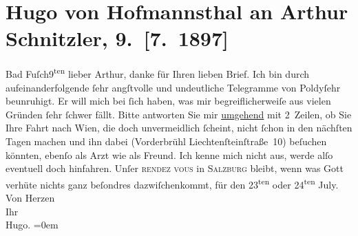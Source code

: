 

         
         \renewcommand{\erwaehntePersonen}{Personen: Leopold von Andrian-Werburg, Hugo von Hofmannsthal}
         \renewcommand{\erwaehnteOrte}{Orte: Bad Fusch, Bad Ischl, Liechtensteinstraße, Salzburg, Wien}
         \renewcommand{\erwaehnteWerke}{}
               \section[Hugo von Hofmannsthal an Arthur Schnitzler, 9. {[}7. 1897{]}]{ Hugo von Hofmannsthal an Arthur Schnitzler, 9. {[}7. 1897{]}}\nopagebreak{}\rehead{ }\begin{ledgroupsized}[t]{13cm}\normalsize\beginnumbering \toendnotes[C]{\smallbreak\pagebreak[2]} 
\pstart
           \raggedleft{}{\pb}Bad Fuſch9\textsuperscript{ten}\pend
           \pstart
           lieber Arthur, danke für Ihren lieben Brief. Ich bin durch
               aufeinanderfolgende ſehr angſtvolle und undeutliche Telegramme von Poldyſehr beunruhigt. Er will mich bei ſich haben, was
               mir begreiflicherweiſe aus vielen Gründen ſehr ſchwer fällt. Bitte antworten Sie mir
                  \uline{umgehend} mit 2 Zeilen, ob Sie Ihre Fahrt nach Wien, die doch unvermeidlich ſcheint, nicht ſchon
               in den nächſten {\pb}Tagen machen und
               ihn dabei (Vorderbrühl Liechtenſteinſtraße 10)
               beſuchen könnten, ebenſo als Arzt wie als Freund. Ich kenne mich nicht aus, werde
               alſo eventuell doch hinfahren.\pend
           \pstart
           Unſer \textsc{rendez vous} in \textsc{Salzburg} bleibt, wenn was Gott verhüte nichts ganz beſondres dazwiſchenkommt, für den
                     23\textsuperscript{ten} oder 24\textsuperscript{ten} July.\pend
           \pstart
           Von Herzen{\\[\baselineskip]}Ihr{\\[\baselineskip]}\spacefill\mbox{Hugo.}\pend
           \leftskip=0em{}
         
         \endnumbering{}\end{ledgroupsized}  \newcommand{\dateiname}{L00697}\newcommand{\titel}{Hugo von Hofmannsthal an Arthur Schnitzler, 9. [7. 1897]}\newcommand{\editorInnen}{Martin Anton Müller und Gerd-Hermann Susen}
      